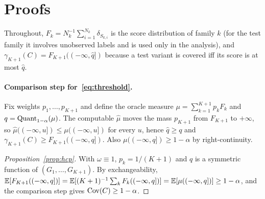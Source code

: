 \section{Proofs}\label{app:proofs}

Throughout, $F_k=N_k^{-1}\sum_{i=1}^{N_k}\delta_{S_{k,i}}$ is the score distribution of family $k$ (for the test family it involves unobserved labels and is used only in the analysis), and $\gamma_{K+1}(C)=F_{K+1}((-\infty,\hat q])$ because a test variant is covered iff its score is at most $\hat q$.

\paragraph{Comparison step for~\eqref{eq:threshold}.}
Fix weights $p_1,\dots,p_{K+1}$ and define the oracle measure $\mu=\sum_{k=1}^{K+1}p_kF_k$ and $q=\mathrm{Quant}_{1-\alpha}(\mu)$. The computable $\hat\mu$ moves the mass $p_{K+1}$ from $F_{K+1}$ to $+\infty$, so $\hat\mu((-\infty,u])\le\mu((-\infty,u])$ for every $u$, hence $\hat q\ge q$ and $\gamma_{K+1}(C)\ge F_{K+1}((-\infty,q])$. Also $\mu((-\infty,q])\ge1-\alpha$ by right-continuity.

\begin{proof}[Proposition~\ref{prop:hcp}]
With $\omega\equiv1$, $p_k=1/(K+1)$ and $q$ is a symmetric function of $(G_1,\dots,G_{K+1})$. By exchangeability, $\mathbb{E}[F_{K+1}((-\infty,q])]=\mathbb{E}[(K+1)^{-1}\sum_kF_k((-\infty,q])]=\mathbb{E}[\mu((-\infty,q])]\ge1-\alpha$, and the comparison step gives $\mathrm{Cov}(C)\ge1-\alpha$.
\end{proof}

